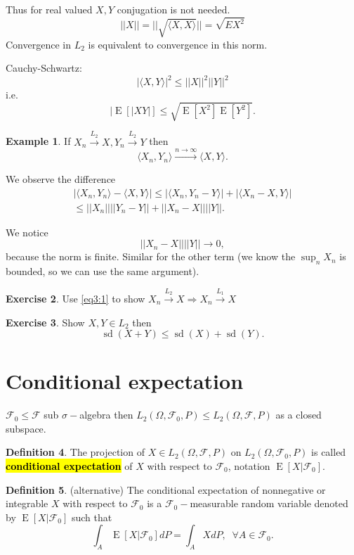 \documentclass[12pt,a4paper, notitlepage]{book}
\newcommand{\hlc}[2][yellow]{ {\sethlcolor{#1} \hl{#2}} }
\newcommand{\hlcr}[1]{\hlc[lightred]{#1}}
\theoremstyle{definition} %
\newtheorem{definition}{Definition}[section]
\newtheorem{example}[definition]{Example}
\newtheorem{exercise}[definition]{Exercise}
\theoremstyle{plain} %
\newcommand{\Fc}{\mathcal{ F}}
\DeclareMathOperator{\E}{E}
\DeclareMathOperator{\Sd}{sd}
\newcommand{\New}[1]{ {\bf \hlcr{#1} } }
\begin{document}
Thus for real valued $X,Y$ conjugation is not needed. 
\[ ||  X || = ||\sqrt{\langle X,X \rangle}|| = \sqrt{EX^2} \]
Convergence in $L_2$ is equivalent to convergence in this norm.

Cauchy-Schwartz:
\[ |\langle X,Y\rangle |^2 \leq ||X||^2 ||Y||^2 \label{eq3:1} \]
i.e.
\[ |\E[ | X Y| ] \leq \sqrt{\E[X^2]  \E[Y^2]}. \]

\begin{example}
If $X_n \overset{L_2}{\rightarrow} X, Y_n \overset{L_2}{\rightarrow} Y$ then
\[  \langle X_n, Y_n\rangle \overset{n \to \infty}{ \rightarrow} \langle X,Y \rangle  . \]
\end{example}
\proof
We observe the difference 
\begin{align*} |\langle X_n, Y_n\rangle  - \langle X,Y\rangle | \leq |\langle X_n, Y_n - Y \rangle | + |\langle X_n - X, Y \rangle | \\ 
\leq ||X_n|| ||Y_n - Y|| + ||X_n - X|| ||Y||.
\end{align*} 

We notice 
\[ ||X_n - X||||Y||\rightarrow 0, \]  because the norm is finite. Similar for the other term (we know the $ \sup_n X_n$ is bounded, so we can use the same argument). 
\endproof


\begin{exercise}
Use 
\ref{eq3:1}
 to show $X_n \overset{L_2}{\rightarrow} X \Rightarrow X_n \overset{L_1}{\rightarrow} X$
\end{exercise}


\begin{exercise}
Show $X, Y \in L_2$ then
\[ \Sd(X + Y) \leq \Sd(X) + \Sd(Y) . \]
\end{exercise}

\section{Conditional expectation}

$ \Fc_0 \leq \Fc$ sub $\sigma-$algebra then
$L_2(\Omega, \Fc_0, P) \leq L_2(\Omega, \Fc, P)$ as a closed subspace.


\begin{definition}
The projection of $X \in L_2(\Omega, \Fc, P)$ on  $L_2(\Omega, \Fc_0, P)$ is called \New{ conditional expectation} of $X$ with respect to $\Fc_0$, notation $\E[X | \Fc_0]$.
\end{definition}

\begin{definition} (alternative)
The conditional expectation of nonnegative or integrable $X$ with respect to $\Fc_0$ is a $\Fc_0-$measurable random variable denoted by $\E[X | \Fc_0]$ such that 
\[ \int_A \E[X | \Fc_0] dP = \int_A X dP, \;\; \forall A \in \Fc_0. \]
\end{definition}
\end{document}
